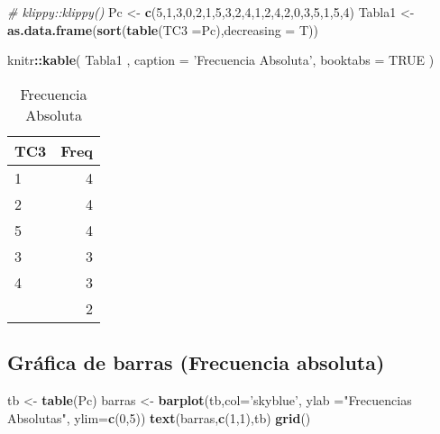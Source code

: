 \documentclass[
]{book}
\newenvironment{Shaded}{\begin{snugshade}}{\end{snugshade}}
\newcommand{\CommentTok}[1]{\textcolor[rgb]{0.56,0.35,0.01}{\textit{#1}}}
\newcommand{\DataTypeTok}[1]{\textcolor[rgb]{0.13,0.29,0.53}{#1}}
\newcommand{\DecValTok}[1]{\textcolor[rgb]{0.00,0.00,0.81}{#1}}
\newcommand{\KeywordTok}[1]{\textcolor[rgb]{0.13,0.29,0.53}{\textbf{#1}}}
\newcommand{\NormalTok}[1]{#1}
\newcommand{\OperatorTok}[1]{\textcolor[rgb]{0.81,0.36,0.00}{\textbf{#1}}}
\newcommand{\OtherTok}[1]{\textcolor[rgb]{0.56,0.35,0.01}{#1}}
\newcommand{\StringTok}[1]{\textcolor[rgb]{0.31,0.60,0.02}{#1}}
\theoremstyle{definition}
\theoremstyle{definition}
\theoremstyle{definition}
\theoremstyle{definition}
\theoremstyle{remark}
\begin{document}
\begin{Shaded}
\begin{Highlighting}[]
\CommentTok{# klippy::klippy()}
\NormalTok{Pc <-}\StringTok{ }\KeywordTok{c}\NormalTok{(}\DecValTok{5}\NormalTok{,}\DecValTok{1}\NormalTok{,}\DecValTok{3}\NormalTok{,}\DecValTok{0}\NormalTok{,}\DecValTok{2}\NormalTok{,}\DecValTok{1}\NormalTok{,}\DecValTok{5}\NormalTok{,}\DecValTok{3}\NormalTok{,}\DecValTok{2}\NormalTok{,}\DecValTok{4}\NormalTok{,}\DecValTok{1}\NormalTok{,}\DecValTok{2}\NormalTok{,}\DecValTok{4}\NormalTok{,}\DecValTok{2}\NormalTok{,}\DecValTok{0}\NormalTok{,}\DecValTok{3}\NormalTok{,}\DecValTok{5}\NormalTok{,}\DecValTok{1}\NormalTok{,}\DecValTok{5}\NormalTok{,}\DecValTok{4}\NormalTok{)}
\NormalTok{Tabla1 <-}\StringTok{ }\KeywordTok{as.data.frame}\NormalTok{(}\KeywordTok{sort}\NormalTok{(}\KeywordTok{table}\NormalTok{(}\DataTypeTok{TC3 =}\NormalTok{Pc),}\DataTypeTok{decreasing =}\NormalTok{ T))}

\NormalTok{knitr}\OperatorTok{::}\KeywordTok{kable}\NormalTok{(}
\NormalTok{Tabla1 , }\DataTypeTok{caption =} \StringTok{'Frecuencia Absoluta'}\NormalTok{,}
  \DataTypeTok{booktabs =} \OtherTok{TRUE}
\NormalTok{)}
\end{Highlighting}
\end{Shaded}

\begin{table}

\caption{\label{tab:Tabla4}Frecuencia Absoluta}
\centering
\begin{tabular}[t]{lr}
\toprule
TC3 & Freq\\
\midrule
1 & 4\\
2 & 4\\
5 & 4\\
3 & 3\\
4 & 3\\
\addlinespace
0 & 2\\
\bottomrule
\end{tabular}
\end{table}

\hypertarget{gruxe1fica-de-barras-frecuencia-absoluta}{%
\subsection{\texorpdfstring{Gráfica de barras (\textbf{Frecuencia absoluta})}{Gráfica de barras (Frecuencia absoluta)}}\label{gruxe1fica-de-barras-frecuencia-absoluta}}

\begin{Shaded}
\begin{Highlighting}[]
\NormalTok{tb <-}\StringTok{ }\KeywordTok{table}\NormalTok{(Pc)}
\NormalTok{barras <-}\StringTok{ }\KeywordTok{barplot}\NormalTok{(tb,}\DataTypeTok{col=}\StringTok{'skyblue'}\NormalTok{, }\DataTypeTok{ylab =}\StringTok{"Frecuencias Absolutas"}\NormalTok{, }\DataTypeTok{ylim=}\KeywordTok{c}\NormalTok{(}\DecValTok{0}\NormalTok{,}\DecValTok{5}\NormalTok{))}
\KeywordTok{text}\NormalTok{(barras,}\KeywordTok{c}\NormalTok{(}\DecValTok{1}\NormalTok{,}\DecValTok{1}\NormalTok{),tb)}
\KeywordTok{grid}\NormalTok{()}
\end{Highlighting}
\end{Shaded}
\end{document}
